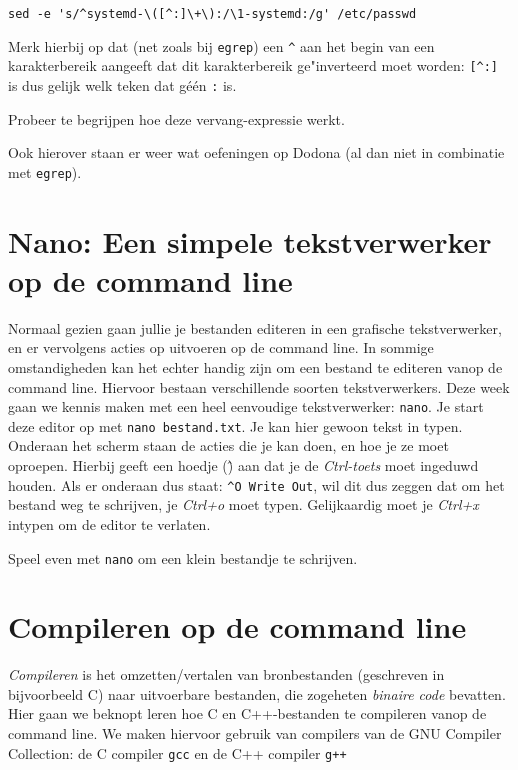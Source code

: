 \documentclass[a4paper,twoside,openany]{memoir}
\begin{document}
\begin{verbatim}
sed -e 's/^systemd-\([^:]\+\):/\1-systemd:/g' /etc/passwd
\end{verbatim}

Merk hierbij op dat (net zoals bij \verb!egrep!) een \verb!^! aan het begin van
een karakterbereik aangeeft dat dit karakterbereik ge"inverteerd moet worden:
\verb![^:]! is dus gelijk welk teken dat géén \verb!:! is.

Probeer te begrijpen hoe deze vervang-expressie werkt.

Ook hierover staan er weer wat oefeningen op Dodona (al dan niet in combinatie
met \verb!egrep!).

\chapter{Nano: Een simpele tekstverwerker op de command line}

Normaal gezien gaan jullie je bestanden editeren in een grafische
tekstverwerker, en er vervolgens acties op uitvoeren op de command line. In
sommige omstandigheden kan het echter handig zijn om een bestand te editeren
vanop de command line. Hiervoor bestaan verschillende soorten tekstverwerkers.
Deze week gaan we kennis maken met een heel eenvoudige tekstverwerker:
\verb!nano!. Je start deze editor op met \verb!nano bestand.txt!. Je kan hier
gewoon tekst in typen. Onderaan het scherm staan de acties die je kan doen, en
hoe je ze moet oproepen. Hierbij geeft een hoedje (\^) aan dat je de
\emph{Ctrl-toets} moet ingeduwd houden. Als er onderaan dus staat: \verb!^O Write Out!,
wil dit dus zeggen dat om het bestand weg te schrijven, je \emph{Ctrl+o} moet
typen. Gelijkaardig moet je \emph{Ctrl+x} intypen om de editor te verlaten.

Speel even met \verb!nano! om een klein bestandje te schrijven.


\chapter{Compileren op de command line}

\emph{Compileren} is het omzetten/vertalen van bronbestanden (geschreven in
bijvoorbeeld C) naar uitvoerbare bestanden, die zogeheten \emph{binaire code}
bevatten. Hier gaan we beknopt leren hoe C en C++-bestanden te compileren vanop
de command line. We maken hiervoor gebruik van compilers van de GNU Compiler
Collection: de C compiler \verb!gcc! en de C++ compiler \verb!g++! 
\end{document}
